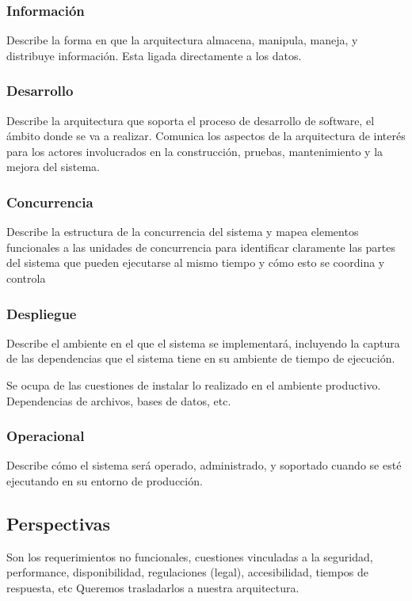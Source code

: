 \subsubsection*{Información}
Describe la forma en que la arquitectura almacena, manipula, maneja, y distribuye información. Esta ligada directamente a los datos.

\subsubsection*{Desarrollo}
Describe la arquitectura que soporta el proceso de desarrollo de software, el ámbito donde se va a realizar. Comunica los aspectos de la arquitectura de interés
para los actores involucrados en la construcción, pruebas, mantenimiento y la mejora del sistema.

\subsubsection*{Concurrencia}
Describe la estructura de la concurrencia del sistema y mapea elementos
funcionales a las unidades de concurrencia para identificar claramente las
partes del sistema que pueden ejecutarse al mismo tiempo y cómo esto se
coordina y controla

\subsubsection*{Despliegue}
Describe el ambiente en el que el sistema se implementará, incluyendo la
captura de las dependencias que el sistema tiene en su ambiente de tiempo
de ejecución.

Se ocupa de las cuestiones de instalar lo realizado en el ambiente productivo. Dependencias de archivos, bases de datos, etc.

\subsubsection*{Operacional}
Describe cómo el sistema será operado, administrado, y soportado cuando
se esté ejecutando en su entorno de producción. 

\subsection*{Perspectivas}
Son los requerimientos no funcionales, cuestiones vinculadas a la seguridad, performance, disponibilidad, regulaciones (legal), accesibilidad, tiempos de respuesta, etc
Queremos trasladarlos a nuestra arquitectura. 

